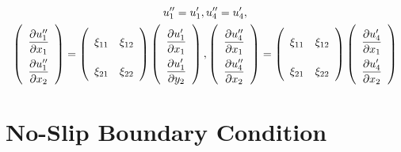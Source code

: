 \documentclass[a4paper,12pt,dvips]{article}
\begin{document}
\begin{gather*}
  u''_1 = u'_1, u''_4 = u'_4,
  \\
  \renewcommand{\arraystretch}{2.2}
  \left(\begin{array}{c}
    \dfrac{\partial u''_1}{\partial x_1} \\
    \dfrac{\partial u''_1}{\partial x_2}
  \end{array}\right)
  = \left(\begin{array}{ccc}
    \xi_{11} & \xi_{12} \\
    \xi_{21} & \xi_{22}
  \end{array}\right)
  \left(\begin{array}{c}
    \dfrac{\partial u'_1}{\partial x_1} \\
    \dfrac{\partial u'_1}{\partial y_2}
  \end{array}\right),
  \left(\begin{array}{c}
    \dfrac{\partial u''_4}{\partial x_1} \\
    \dfrac{\partial u''_4}{\partial x_2}
  \end{array}\right)
  = \left(\begin{array}{ccc}
    \xi_{11} & \xi_{12} \\
    \xi_{21} & \xi_{22}
  \end{array}\right)
  \left(\begin{array}{c}
    \dfrac{\partial u'_4}{\partial x_1} \\
    \dfrac{\partial u'_4}{\partial x_2}
  \end{array}\right)
\end{gather*}

\section{No-Slip Boundary Condition}



\end{document}
